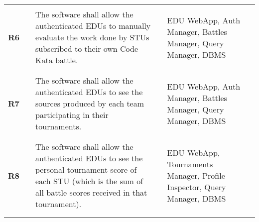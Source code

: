 \begin{longtable}[H]{l l p{6cm} l p{4cm} l}
                            &        &                                                                                                                                                                                                                                                                              &        &       \\\hline  & & \\ 
    \textbf{R6}             & \vline & The software shall allow the authenticated EDUs to manually evaluate the work done by STUs subscribed to their own Code Kata battle.                                                                                                                                         & \vline &  EDU WebApp, Auth Manager, Battles Manager, Query Manager, DBMS \\          
                            &        &                                                                                                                                                                                                                                                                              &        &       \\\hline  & & \\ 
    \textbf{R7}             & \vline & The software shall allow the authenticated EDUs to see the sources produced by each team participating in their tournaments.                                                                                                                                                 & \vline &  EDU WebApp, Auth Manager, Battles Manager, Query Manager, DBMS \\          
                            &        &                                                                                                                                                                                                                                                                              &        &       \\\hline  & & \\ 
    \textbf{R8}             & \vline & The software shall allow the authenticated EDUs to see the personal tournament score of each STU (which is the sum of all battle scores received in that tournament).                                                                                                        & \vline &  EDU WebApp, Tournaments Manager, Profile Inspector, Query Manager, DBMS \\          
                            &        &                                                                                                                                                                                                                                                                              &        &       \\\hline  & & \\ 

\end{longtable}
